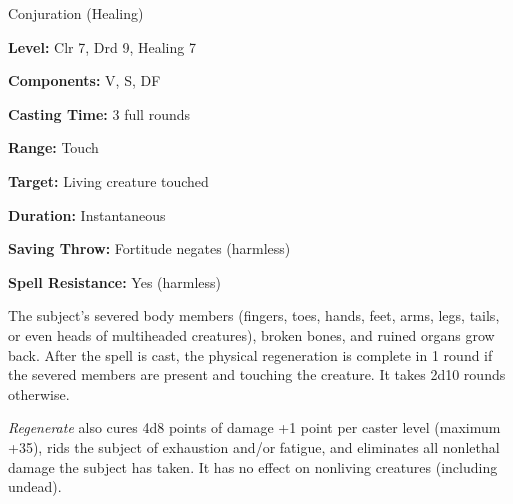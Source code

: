 
Conjuration (Healing)

\textbf{Level:} Clr 7, Drd 9, Healing 7

\textbf{Components:} V, S, DF

\textbf{Casting Time:} 3 full rounds

\textbf{Range:} Touch

\textbf{Target:} Living creature touched

\textbf{Duration:} Instantaneous

\textbf{Saving Throw:} Fortitude negates (harmless)

\textbf{Spell Resistance:} Yes (harmless)

The subject's severed body members (fingers, toes, hands, feet, arms, legs, tails, 
or even heads of multiheaded creatures), broken bones, and ruined organs grow back. 
After the spell is cast, the physical regeneration is complete in 1 round if the 
severed members are present and touching the creature. It takes 2d10 rounds otherwise.

\textit{Regenerate} also cures 4d8 points of damage +1 point per caster level (maximum 
+35), rids the subject of exhaustion and/or fatigue, and eliminates all nonlethal 
damage the subject has taken. It has no effect on nonliving creatures (including 
undead).

